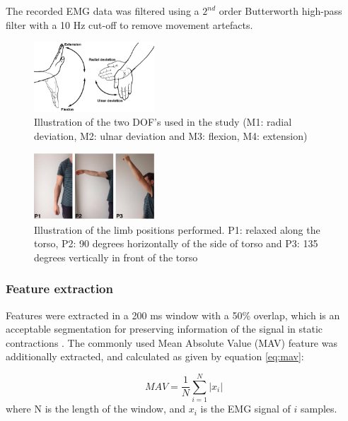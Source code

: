 \begin{multicols}{2}
The recorded EMG data was filtered using a $2^{nd}$ order Butterworth high-pass filter with a 10 Hz cut-off to remove movement artefacts. 

\begin{figure}[H]
	\centering
	\includegraphics[width=0.4\textwidth]{figures/paperFigures/wristmovement}  %
	\caption{Illustration of the two DOF's used in the study (M1: radial deviation, M2: ulnar deviation and M3: flexion, M4: extension)}
	\label{fig:wristmovement}  %
\end{figure}

\begin{figure}[H]
	\centering
	\includegraphics[width=0.4\textwidth]{figures/paperFigures/limb_pos}  %
	\caption{Illustration of the limb positions performed. P1: relaxed along the torso, P2: 90 degrees horizontally of the side of torso and P3: 135 degrees vertically in front of the torso}
	\label{fig:limbpositions}  %
\end{figure}

\subsubsection*{Feature extraction}
Features were extracted in a 200 ms window with a 50\% overlap, which is an acceptable segmentation for preserving information of the signal in static contractions \cite{Farfan2010}.
The commonly used Mean Absolute Value (MAV) feature was additionally extracted, and calculated as given by equation \ref{eq:mav}: \cite{Zecca2002} 

\begin{equation} \label{eq:mav}
MAV = \frac{1}{N}\sum\limits_{i=1}^N|x_i|
\end{equation}
where N is the length of the window, and $x_i$ is the EMG signal of $i$ samples.


\end{multicols}
